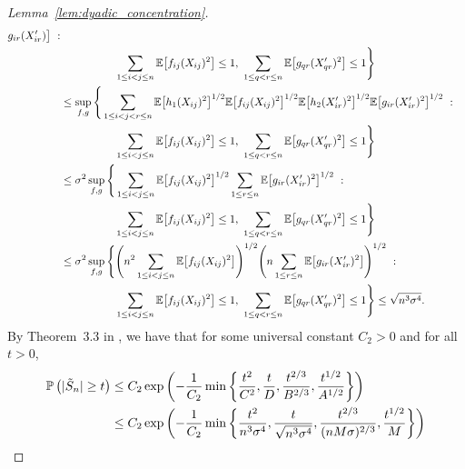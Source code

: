 \begin{proof}[Lemma~\ref{lem:dyadic_concentration}]
\begin{align*}
    g_{ir}(X'_{ir})
    \big]
    \ : \\
    &\qquad\qquad\quad
    \sum_{1 \leq i < j \leq n}
    \E\big[f_{ij}(X_{ij})^2\big]
    \leq 1, \
    \sum_{1 \leq q < r \leq n}
    \E\big[g_{qr}(X'_{qr})^2\big]
    \leq 1
    \Bigg\} \\
    &\leq
    \sup_{f,g} \Bigg\{
    \sum_{1 \leq i < j < r \leq n}
    \E\big[ h_1(X_{ij})^2 \big]^{1/2}
    \E\big[ f_{ij}(X_{ij})^2 \big]^{1/2}
    \E\big[ h_2(X_{ir}')^2 \big]^{1/2}
    \E\big[ g_{ir}(X'_{ir})^2 \big]^{1/2}
    \ : \\
    &\qquad\qquad\quad
    \sum_{1 \leq i < j \leq n}
    \E\big[f_{ij}(X_{ij})^2\big]
    \leq 1, \
    \sum_{1 \leq q < r \leq n}
    \E\big[g_{qr}(X'_{qr})^2\big]
    \leq 1
    \Bigg\} \\
    &\leq
    \sigma^2
    \sup_{f,g} \Bigg\{
    \sum_{1 \leq i < j \leq n}
    \E\big[ f_{ij}(X_{ij})^2 \big]^{1/2}
    \sum_{1 \leq r \leq n }
    \E\big[ g_{ir}(X'_{ir})^2 \big]^{1/2}
    \ : \\
    &\qquad\qquad\quad
    \sum_{1 \leq i < j \leq n}
    \E\big[f_{ij}(X_{ij})^2\big]
    \leq 1, \
    \sum_{1 \leq q < r \leq n}
    \E\big[g_{qr}(X'_{qr})^2\big]
    \leq 1
    \Bigg\} \\
    &\leq
    \sigma^2
    \sup_{f,g} \Bigg\{
    \Bigg(
    n^2
    \sum_{1 \leq i < j \leq n}
    \E\big[ f_{ij}(X_{ij})^2 \big]
    \Bigg)^{1/2}
    \Bigg(
    n
    \sum_{1 \leq r \leq n }
    \E\big[ g_{ir}(X'_{ir})^2 \big]
    \Bigg)^{1/2}
    \ : \\
    &\qquad\qquad\quad
    \sum_{1 \leq i < j \leq n}
    \E\big[f_{ij}(X_{ij})^2\big]
    \leq 1, \
    \sum_{1 \leq q < r \leq n}
    \E\big[g_{qr}(X'_{qr})^2\big]
    \leq 1
    \Bigg\}
    \leq
    \sqrt{n^3 \sigma^4}.
  \end{align*}
  \endgroup
  By Theorem~3.3 in
  \citet{gine2000exponential},
  we have that for some universal constant
  $C_2 > 0$
  and for all $t > 0$,
  \begin{align*}
    \P\left(
      |\tilde S_n| \geq t
    \right)
    &\leq
    C_2 \exp\left(
      -\frac{1}{C_2}
      \min \left\{
      \frac{t^2}{C^2},
      \frac{t}{D},
      \frac{t^{2/3}}{B^{2/3}},
      \frac{t^{1/2}}{A^{1/2}}
      \right\}
    \right) \\
    &\leq
    C_2 \exp\left(
      -\frac{1}{C_2}
      \min \left\{
      \frac{t^2}{n^3 \sigma^4},
      \frac{t}{\sqrt{n^3 \sigma^4}},
      \frac{t^{2/3}}{(n M \sigma)^{2/3}},
      \frac{t^{1/2}}{M}
      \right\}
    \right)
  \end{align*}


\end{proof}
